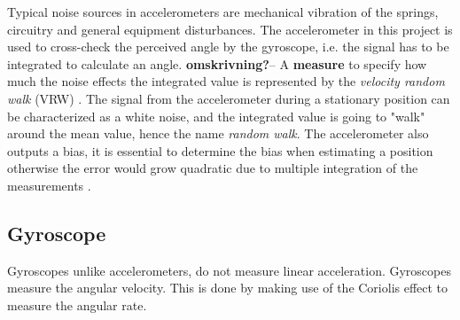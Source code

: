 \documentclass[a4paper,11pt]{kth-mag}
\begin{document}
Typical noise sources in accelerometers are mechanical vibration of the springs, circuitry and general equipment disturbances. The accelerometer in this project is used to cross-check the perceived angle by the gyroscope, i.e. the signal has to be integrated to calculate an angle. \textbf{omskrivning?}-- A \textbf{measure} to specify how much the noise effects the integrated value is represented 
by the \textit{velocity random walk} (VRW) \cite{ARW}. The signal from the accelerometer during a stationary position can be characterized as a white noise, and the integrated value is going to "walk" around the mean value, hence the name \textit{random walk}.
The accelerometer also outputs a bias, it is essential to determine the bias when estimating a position otherwise the error would grow quadratic due to multiple integration of the measurements \cite{ref:accelerometero}.

\subsection{Gyroscope} \label{gyroscope}
Gyroscopes unlike accelerometers, do not measure linear acceleration. Gyroscopes measure the angular velocity. This is done by making use of the Coriolis effect to measure the angular rate.
\end{document}
